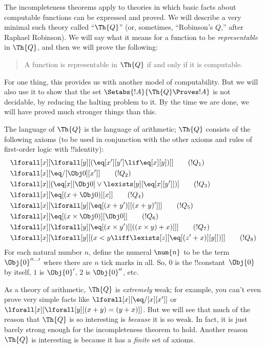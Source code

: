 \documentclass[../../../include/open-logic-section]{subfiles}
\begin{document}

The incompleteness theorems apply to theories in which basic facts
about computable functions can be expressed and proved.  We will
describe a very minimal such theory called ``$\Th{Q}$'' (or, sometimes,
``Robinson's $Q$,'' after Raphael Robinson). We will say what it means
for a function to be \emph{representable} in $\Th{Q}$, and then we
will prove the following:
\begin{quote}
  A function is representable in $\Th{Q}$ if and only if it is computable.
\end{quote}
For one thing, this provides us with another model of
computability. But we will also use it to show that the set
$\Setabs{!A}{\Th{Q} \Proves !A}$ is not decidable, by reducing the
halting problem to it. By the time we are done, we will have proved
much stronger things than this.

The language of $\Th{Q}$ is the language of
arithmetic; $\Th{Q}$ consists of the following axioms
(to be used in conjunction with the other axioms and rules of
first-order logic with !!{identity}):
\begin{align*}
& \lforall[x][\lforall[y][(\eq[x'][y'] \lif \eq[x][y])]] \tag{$!Q_1$}\\
& \lforall[x][\eq/[\Obj 0][x']] \tag{$!Q_2$}\\
& \lforall[x][(\eq[x][\Obj 0] \lor \lexists[y][\eq[x][y']])] \tag{$!Q_3$}\\
& \lforall[x][\eq[(x + \Obj 0)][x]] \tag{$!Q_4$}\\
& \lforall[x][\lforall[y][\eq[(x + y')][(x + y)']]] \tag{$!Q_5$}\\
& \lforall[x][\eq[(x \times \Obj 0)][\Obj 0]] \tag{$!Q_6$}\\
& \lforall[x][\lforall[y][\eq[(x \times y')][((x \times y) + x)]]] \tag{$!Q_7$}\\
& \lforall[x][\lforall[y][(x < y \liff \lexists[z][\eq[(z' + x)][y]])]] \tag{$!Q_8$}
\end{align*}
For each natural number $n$, define the numeral $\num{n}$ to be the
term $\Obj{0}^{\prime\prime\ldots\prime}$ where there are $n$ tick marks in
all.  So, $\num{0}$ is the !!{constant}~$\Obj{0}$ by itself, $\num{1}$
is $\Obj{0}'$, $\num{2}$ is $\Obj{0}''$, etc.

As a theory of arithmetic, $\Th{Q}$ is \emph{extremely} weak; for
example, you can't even prove very simple facts like
$\lforall[x][\eq/[x][x']]$ or $\lforall[x][\lforall[y][(x + y) = (y +
    x)]]$. But we will see that much of the reason that $\Th{Q}$ is so
interesting is \emph{because} it is so weak. In fact, it is just
barely strong enough for the incompleteness theorem to hold. Another
reason $\Th{Q}$ is interesting is because it has a \emph{finite} set
of axioms.
\end{document}
